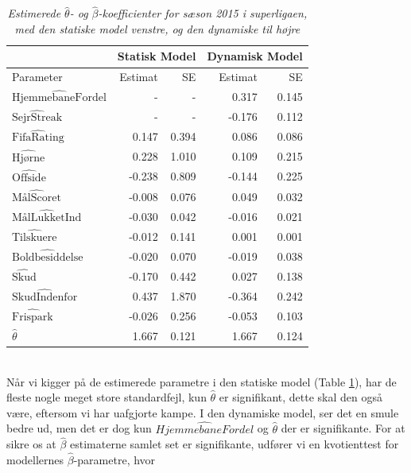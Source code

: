 \documentclass[11pt,a4paper]{article}
\begin{document}
\begin{table}[ht]
\centering
\begin{adjustbox}{max width=\textwidth}
\begin{tabular}{|l|rr|rr|}
\hline
\multicolumn{1}{|l|}{} & \multicolumn{2}{l|}{Statisk Model} & \multicolumn{2}{l|}{Dynamisk Model} \\
\hline
Parameter & Estimat & SE & Estimat & SE \\
  \hline
    $\hat{\text{HjemmebaneFordel}}$ & - & - & 0.317 & 0.145\\
    $\hat{\text{SejrStreak}}$ & - & - & -0.176 & 0.112\\
    $\hat{\text{FifaRating}}$ & 0.147 & 0.394 & 0.086 & 0.086\\
    $\hat{\text{Hjørne}}$ & 0.228 & 1.010 & 0.109 & 0.215\\
    $\hat{\text{Offside}}$ & -0.238 & 0.809 & -0.144 & 0.225\\
    $\hat{\text{MålScoret}}$ & -0.008 & 0.076 & 0.049 & 0.032\\
    $\hat{\text{MålLukketInd}}$ & -0.030 & 0.042 & -0.016 & 0.021\\
    $\hat{\text{Tilskuere}}$ & -0.012 & 0.141 & 0.001 & 0.001\\
    $\hat{\text{Boldbesiddelse}}$ & -0.020 & 0.070 & -0.019 & 0.038\\
    $\hat{\text{Skud}}$ & -0.170 & 0.442 & 0.027 & 0.138\\
    $\hat{\text{SkudIndenfor}}$ & 0.437 & 1.870 & -0.364 & 0.242\\
    $\hat{\text{Frispark}}$ & -0.026 & 0.256 & -0.053 & 0.103\\
    $\hat{\theta}$ & 1.667 & 0.121 & 1.667 & 0.124\\
   \hline
\end{tabular}
\end{adjustbox}
\caption{\label{tab:Modelestimater}\textit{Estimerede $\hat{\theta}$- og $\hat{\beta}$-koefficienter for sæson 2015 i superligaen, med den statiske model venstre, og den dynamiske til højre}}
\end{table}
\\Når vi kigger på de estimerede parametre i den statiske model (Table \ref{tab:Modelestimater}), har de fleste nogle meget store standardfejl, kun $\hat{\theta}$ er signifikant, dette skal den også være, eftersom vi har uafgjorte kampe. I den dynamiske model, ser det en smule bedre ud, men det er dog kun $\hat{HjemmebaneFordel}$ og $\hat{\theta}$ der er signifikante. For at sikre os at $\hat{\beta}$ estimaterne samlet set er signifikante, udfører vi en kvotienttest for modellernes $\hat{\beta}$-parametre, hvor  \\
\end{document}
